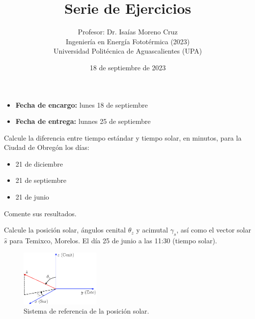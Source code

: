 \documentclass[spanish, letterpaper,12]{article}
\newenvironment{problem}[2][Problema]{\begin{trivlist}
\item[\hskip \labelsep {\bfseries #1}\hskip \labelsep {\bfseries #2.}]}{\end{trivlist}}
\begin{document}
 
\title{Serie de Ejercicios}
\author{Profesor: Dr. Isaías Moreno Cruz\\
  Ingeniería en Energía Fototérmica (2023)\\
Universidad Politécnica de Aguascalientes (UPA)}
\date{18 de septiembre de 2023}

\maketitle

\begin{itemize}[leftmargin=*, noitemsep]
\item \textbf{Fecha de encargo:} lunes 18 de septiembre
\item \textbf{Fecha de entrega:} lunnes 25 de septiembre
\end{itemize}
\thispagestyle{fancy}
\begin{problem}{1}
  Calcule la diferencia entre tiempo estándar y tiempo solar, en minutos, para la Ciudad de Obregón los días:
  \begin{itemize}[noitemsep]
    \item 21 de diciembre
    \item 21 de septiembre
    \item 21 de junio
  \end{itemize}

  Comente sus resultados.
\end{problem}

\begin{problem}{2}
  Calcule la posición solar, ángulos cenital $\theta_z$ y acimutal $\gamma_s$, así como el vector solar $\hat s$ para Temixco, Morelos. El día 25 de junio  a las 11:30 (tiempo solar).

\begin{figure}[ht]
  \centering
  \includegraphics[width=0.35\textwidth]{vectorSolar}
  \caption{\label{fig:vectorSolar} Sistema de referencia de la posición solar.}
\end{figure}

\end{problem}
\end{document}
